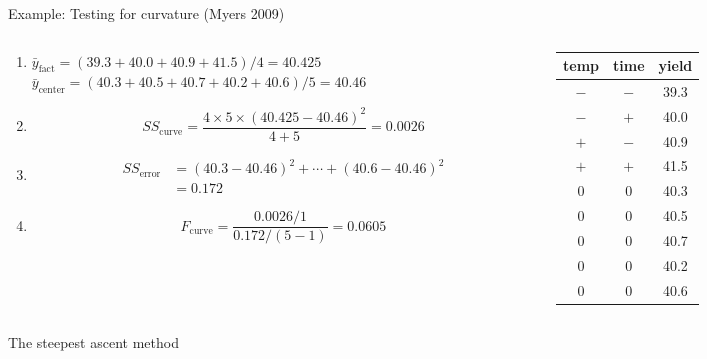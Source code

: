 \documentclass[10pt]{beamer}
\newcommand\lo{\ensuremath{\boldsymbol{-}}}
\newcommand\hi{\ensuremath{\boldsymbol{+}}}
\begin{document}
{\small
\begin{frame}{Example: Testing for curvature (Myers 2009)}
\begin{columns}
\begin{column}{0.7\textwidth}
\begin{enumerate}
  \item<2-> $\bar{y}_\text{fact} = (39.3+40.0+40.9+41.5)/4 = 40.425$ \\
    $\bar{y}_\text{center} = (40.3+40.5+40.7+40.2+40.6)/5 = 40.46$
  \item<3-> \[ SS_\text{curve} = \frac{4\times 5\times(40.425 - 40.46)^2}{4+5} = 0.0026 \]
  \item<4-> \begin{align*}
    SS_\text{error} &= (40.3-40.46)^2 + \cdots + (40.6-40.46)^2 \\
                &= 0.172
    \end{align*}
  \item<5-> \[ F_\text{curve} = \frac{0.0026/1}{0.172/(5-1)} = 0.0605 \]
\end{enumerate}
\end{column}
\begin{column}{0.3\textwidth}

\begin{tabular}{ccc}
\toprule
temp & time & yield \\
\midrule
\lo & \lo & 39.3 \\
\lo & \hi & 40.0 \\
\hi & \lo & 40.9 \\
\hi & \hi & 41.5 \\
\midrule
0 & 0 & 40.3 \\
0 & 0 & 40.5 \\
0 & 0 & 40.7 \\
0 & 0 & 40.2 \\
0 & 0 & 40.6 \\
\bottomrule
\end{tabular}

\end{column}
\end{columns}

\bigskip
{}

\end{frame}

\begin{frame}{The steepest ascent method}


\end{frame}}
\end{document}
